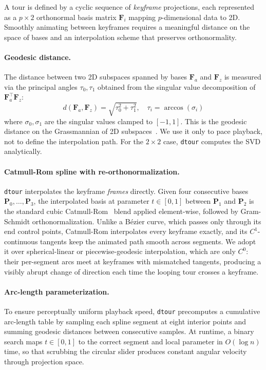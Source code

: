 \documentclass{vgtc}
\newcommand{\dtour}{\texorpdfstring{\texttt{dtour}\xspace}{dtour}}
\begin{document}
A tour is defined by a cyclic sequence of \emph{keyframe} projections, each represented as a $p \times 2$ orthonormal basis matrix $\mathbf{F}_i$ mapping $p$-dimensional data to 2D. Smoothly animating between keyframes requires a meaningful distance on the space of bases and an interpolation scheme that preserves orthonormality.

\paragraph{Geodesic distance.}
The distance between two 2D subspaces spanned by bases $\mathbf{F}_a$ and $\mathbf{F}_z$ is measured via the principal angles $\tau_0, \tau_1$ obtained from the singular value decomposition of $\mathbf{F}_a^{\!\top} \mathbf{F}_z$:
%
\begin{equation}
  d(\mathbf{F}_a, \mathbf{F}_z) = \sqrt{\tau_0^2 + \tau_1^2},
  \quad \tau_i = \arccos(\sigma_i)
  \label{eq:geodesic}
\end{equation}
%
where $\sigma_0, \sigma_1$ are the singular values clamped to $[-1,1]$. This is the geodesic distance on the Grassmannian of 2D subspaces~\cite{buja2005computational}. We use it only to pace playback, not to define the interpolation path. For the $2 \times 2$ case, \dtour{} computes the SVD analytically.

\paragraph{Catmull-Rom spline with re-orthonormalization.} \dtour{} interpolates the keyframe \emph{frames} directly. Given four consecutive bases $\mathbf{P}_0, \ldots, \mathbf{P}_3$, the interpolated basis at parameter $t \in [0,1]$ between $\mathbf{P}_1$ and $\mathbf{P}_2$ is the standard cubic Catmull-Rom~\cite{catmull1974class} blend applied element-wise, followed by Gram-Schmidt orthonormalization. Unlike a B\'ezier curve, which passes only through its end control points, Catmull-Rom interpolates every keyframe exactly, and its $C^1$-continuous tangents keep the animated path smooth across segments. We adopt it over spherical-linear or piecewise-geodesic interpolation, which are only $C^0$: their per-segment arcs meet at keyframes with mismatched tangents, producing a visibly abrupt change of direction each time the looping tour crosses a keyframe.

\paragraph{Arc-length parameterization.} To ensure perceptually uniform playback speed, \dtour{} precomputes a cumulative arc-length table by sampling each spline segment at eight interior points and summing geodesic distances between consecutive samples. At runtime, a binary search maps $t \in [0,1]$ to the correct segment and local parameter in $O(\log n)$ time, so that scrubbing the circular slider produces constant angular velocity through projection space.
\end{document}
